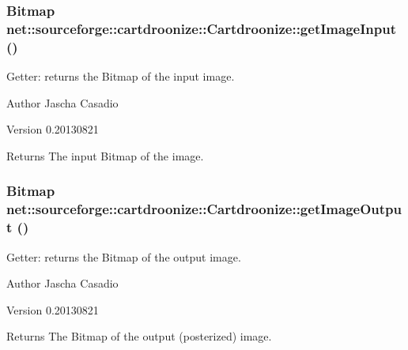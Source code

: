 \hypertarget{classnet_1_1sourceforge_1_1cartdroonize_1_1Cartdroonize_a5f00ec77ddb515699581ecb8e2ebd227}{
\subsubsection[{getImageInput}]{\setlength{\rightskip}{0pt plus 5cm}Bitmap net::sourceforge::cartdroonize::Cartdroonize::getImageInput ()}}
\label{classnet_1_1sourceforge_1_1cartdroonize_1_1Cartdroonize_a5f00ec77ddb515699581ecb8e2ebd227}


Getter: returns the Bitmap of the input image. \begin{DoxyAuthor}{Author}
Jascha Casadio 
\end{DoxyAuthor}
\begin{DoxyVersion}{Version}
0.20130821 
\end{DoxyVersion}
\begin{DoxyReturn}{Returns}
The input Bitmap of the image.
\end{DoxyReturn}


\hypertarget{classnet_1_1sourceforge_1_1cartdroonize_1_1Cartdroonize_a82804cde26412ce24fed465b59236548}{
\subsubsection[{getImageOutput}]{\setlength{\rightskip}{0pt plus 5cm}Bitmap net::sourceforge::cartdroonize::Cartdroonize::getImageOutput ()}}
\label{classnet_1_1sourceforge_1_1cartdroonize_1_1Cartdroonize_a82804cde26412ce24fed465b59236548}


Getter: returns the Bitmap of the output image. \begin{DoxyAuthor}{Author}
Jascha Casadio 
\end{DoxyAuthor}
\begin{DoxyVersion}{Version}
0.20130821 
\end{DoxyVersion}
\begin{DoxyReturn}{Returns}
The Bitmap of the output (posterized) image.
\end{DoxyReturn}


